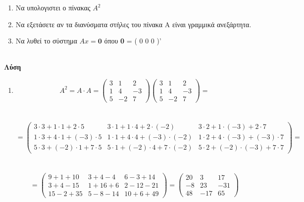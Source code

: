 \documentclass[12pt,a4paper]{article}
\begin{document}
\begin{enumerate}
\item Να υπολογιστει ο πίνακας $Α^2$
\item Να εξετάσετε αν τα διανύσματα στήλες του πίνακα Α είναι γραμμικά ανεξάρτητα.
\item Να λυθεί το σύστημα $Αx=\textbf{0}$ όπου  \textbf{0} = ( 0 0 0 )'\\\\
\end{enumerate}
\textbf{Λύση}\\
\begin{enumerate}
\item 
\[A^2=A \cdot A = \left( {\begin{array}{*{20}{c}}
3&1&2\\
1&4&{ - 3}\\
5&{ - 2}&7
\end{array}} \right)\left( {\begin{array}{*{20}{c}}
3&1&2\\
1&4&{ - 3}\\
5&{ - 2}&7
\end{array}} \right) = \]\\\\
\[ = \left( {\begin{array}{*{20}{c}}
{3 \cdot 3 + 1 \cdot 1 + 2 \cdot 5}&{3 \cdot 1 + 1 \cdot 4 + 2 \cdot ( - 2)}&{3 \cdot 2 + 1 \cdot ( - 3) + 2 \cdot 7}\\
{1 \cdot 3 + 4 \cdot 1 + ( - 3) \cdot 5}&{1 \cdot 1 + 4 \cdot 4 + ( - 3) \cdot ( - 2)}&{1 \cdot 2 + 4 \cdot ( - 3) + ( - 3) \cdot 7}\\
{5 \cdot 3 + ( - 2) \cdot 1 + 7 \cdot 5}&{5 \cdot 1 + ( - 2) \cdot 4 + 7 \cdot ( - 2)}&{5 \cdot 2 + ( - 2) \cdot ( - 3) + 7 \cdot 7}
\end{array}} \right) = \]\\\\
\[ = \left( {\begin{array}{*{20}{c}}
{9 + 1 + 10}&{3 + 4 - 4}&{6 - 3 + 14}\\
{3 + 4 - 15}&{1 + 16 + 6}&{2 - 12 - 21}\\
{15 - 2 + 35}&{5 - 8 - 14}&{10 + 6 + 49}
\end{array}} \right) = \left( {\begin{array}{*{20}{c}}
{20}&3&{17}\\
{ - 8}&{23}&{ - 31}\\
{48}&{ - 17}&{65}
\end{array}} \right)\]
\\\\



\end{enumerate}
\end{document}
